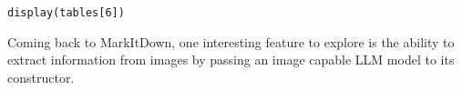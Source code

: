 
\begin{verbatim}
display(tables[6])
\end{verbatim}

Coming back to MarkItDown, one interesting feature to explore is the ability to extract information from images by passing an image capable LLM model to its constructor.

